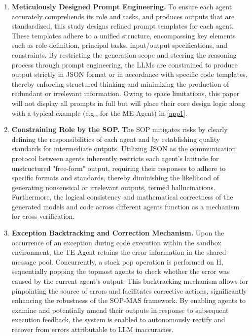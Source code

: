 \documentclass[preprint,12pt]{elsarticle}
\begin{document}
\begin{enumerate}[label=\arabic*)]
    \item \textbf{Meticulously Designed Prompt Engineering.} To ensure each agent accurately comprehends its role and tasks, and produces outputs that are standardized, this study designs refined prompt templates for each agent. These templates adhere to a unified structure, encompassing key elements such as role definition, principal tasks, input/output specifications, and constraints. By restricting the generation scope and steering the reasoning process through prompt engineering, the LLMs are constrained to produce output strictly in JSON format or in accordance with  specific code templates, thereby enforcing structured thinking and minimizing the production of redundant or irrelevant information. Owing to space limitations, this paper will not display all prompts in full but will place their core design logic along with a typical example (e.g., for the ME-Agent) in \ref{app1}.
    \item \textbf{Constraining Role by the SOP.} The SOP mitigates risks by clearly defining the responsibilities of each agent and by establishing quality standards for intermediate outputs. Utilizing JSON as the communication protocol between agents inherently restricts each agent's latitude for unstructured "free-form" output, requiring their responses to adhere to specific formats and standards, thereby diminishing the likelihood of generating nonsensical or irrelevant outputs, termed hallucinations. Furthermore, the logical consistency and mathematical correctness of the generated models and code across different agents function as a mechanism for cross-verification.
    \item \textbf{Exception Backtracking and Correction Mechanism.} Upon the occurrence of an exception during code execution within the sandbox environment, the TE-Agent retains the error information in the shared message pool. Concurrently, a stack pop operation is performed on H, sequentially popping the topmost agents to check whether the error was caused by the current agent's output. This backtracking mechanism allows for pinpointing the source of errors and facilitates corrective actions, significantly enhancing the robustness of the SOP-MAS framework. By enabling agents to examine and potentially amend their outputs in response to subsequent execution feedback, the system is enabled to autonomously rectify and recover from errors attributable to LLM inaccuracies.
\end{enumerate}
\end{document}
